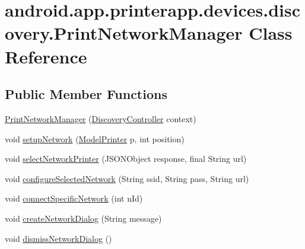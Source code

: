 \hypertarget{classandroid_1_1app_1_1printerapp_1_1devices_1_1discovery_1_1_print_network_manager}{}\section{android.\+app.\+printerapp.\+devices.\+discovery.\+Print\+Network\+Manager Class Reference}
\label{classandroid_1_1app_1_1printerapp_1_1devices_1_1discovery_1_1_print_network_manager}
\subsection*{Public Member Functions}
\begin{DoxyCompactItemize}
\item 
\hyperlink{classandroid_1_1app_1_1printerapp_1_1devices_1_1discovery_1_1_print_network_manager_a1259a433b9864cae63c62a63c0f2a36f}{Print\+Network\+Manager} (\hyperlink{classandroid_1_1app_1_1printerapp_1_1devices_1_1discovery_1_1_discovery_controller}{Discovery\+Controller} context)
\item 
void \hyperlink{classandroid_1_1app_1_1printerapp_1_1devices_1_1discovery_1_1_print_network_manager_ad88f529fde71b1302c0c2b34643cbe0d}{setup\+Network} (\hyperlink{classandroid_1_1app_1_1printerapp_1_1model_1_1_model_printer}{Model\+Printer} p, int position)
\item 
void \hyperlink{classandroid_1_1app_1_1printerapp_1_1devices_1_1discovery_1_1_print_network_manager_a58ab66e04451c1020210982594ac298a}{select\+Network\+Printer} (J\+S\+O\+N\+Object response, final String url)
\item 
void \hyperlink{classandroid_1_1app_1_1printerapp_1_1devices_1_1discovery_1_1_print_network_manager_ad71cc446747229a1c3be1838893a2e55}{configure\+Selected\+Network} (String ssid, String pass, String url)
\item 
void \hyperlink{classandroid_1_1app_1_1printerapp_1_1devices_1_1discovery_1_1_print_network_manager_a6e80f7bbb80f9506f0a5f5a4f65b31a0}{connect\+Specific\+Network} (int n\+Id)
\item 
void \hyperlink{classandroid_1_1app_1_1printerapp_1_1devices_1_1discovery_1_1_print_network_manager_ac0fe117be3cec83f09345d1fc0b616f3}{create\+Network\+Dialog} (String message)
\item 
void \hyperlink{classandroid_1_1app_1_1printerapp_1_1devices_1_1discovery_1_1_print_network_manager_a517a8cc9f3433ac259ffb81c7f3d74eb}{dismiss\+Network\+Dialog} ()

\end{DoxyCompactItemize}
